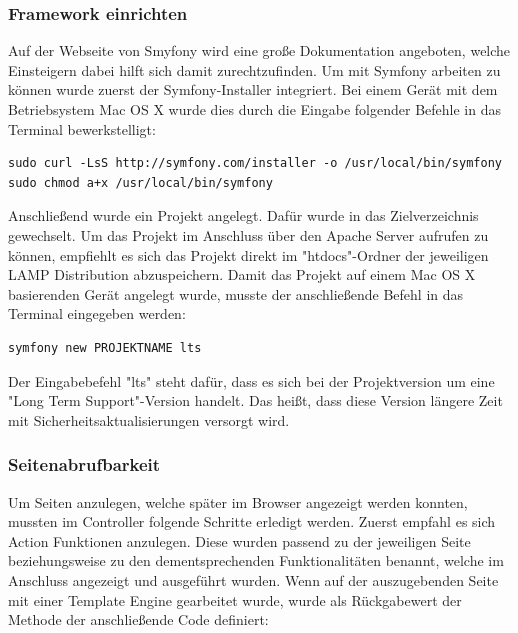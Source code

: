     \subsubsection{Framework einrichten}

Auf der {Webseite von Smyfony\cite{symfony}} wird eine große Dokumentation angeboten, welche Einsteigern dabei hilft sich damit zurechtzufinden. Um mit Symfony arbeiten zu können wurde zuerst der Symfony-Installer integriert. Bei einem Gerät mit dem Betriebsystem Mac OS X wurde dies durch die Eingabe folgender Befehle in das Terminal bewerkstelligt:
	\lstset{language = bash}
  	\begin{lstlisting}
sudo curl -LsS http://symfony.com/installer -o /usr/local/bin/symfony
sudo chmod a+x /usr/local/bin/symfony
  	\end{lstlisting}
Anschließend wurde ein Projekt angelegt. Dafür wurde in das Zielverzeichnis gewechselt. Um das Projekt im Anschluss über den Apache Server aufrufen zu können, empfiehlt es sich das Projekt direkt im "htdocs"-Ordner der jeweiligen LAMP Distribution abzuspeichern. Damit das Projekt auf einem Mac OS X basierenden Gerät angelegt wurde, musste der anschließende Befehl in das Terminal eingegeben werden:
	\lstset{language = bash}
  	\begin{lstlisting}
symfony new PROJEKTNAME lts
  	\end{lstlisting}
Der Eingabebefehl "lts" steht dafür, dass es sich bei der Projektversion um eine "Long Term Support"-Version handelt. Das heißt, dass diese Version längere Zeit mit Sicherheitsaktualisierungen versorgt wird.

    \subsubsection{Seitenabrufbarkeit}

Um Seiten anzulegen, welche später im Browser angezeigt werden konnten, mussten im Controller folgende Schritte erledigt werden. Zuerst empfahl es sich Action Funktionen anzulegen. Diese wurden passend zu der jeweiligen Seite beziehungsweise zu den dementsprechenden Funktionalitäten benannt, welche im Anschluss angezeigt und ausgeführt wurden. Wenn auf der auszugebenden Seite mit einer Template Engine gearbeitet wurde, wurde als Rückgabewert der Methode der anschließende Code definiert:
	
